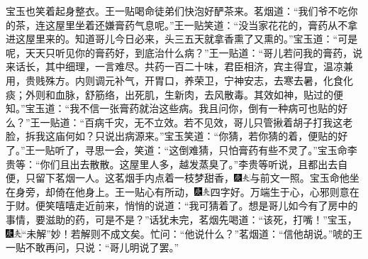 宝玉也笑着起身整衣。王一贴喝命徒弟们快泡好酽茶来。茗烟道：``我们爷不吃你的茶，连这屋里坐着还嫌膏药气息呢。''王一贴笑道：``没当家花花的，膏药从不拿进这屋里来的。知道哥儿今日必来，头三五天就拿香熏了又熏的。''宝玉道：``可是呢，天天只听见你的膏药好，到底治什么病？''王一贴道：``哥儿若问我的膏药，说来话长，其中细理，一言难尽。共药一百二十味，君臣相济，宾主得宜，温凉兼用，贵贱殊方。内则调元补气，开胃口，养荣卫，宁神安志，去寒去暑，化食化痰；外则和血脉，舒筋络，出死肌，生新肉，去风散毒。其效如神，贴过的便知。''宝玉道：``我不信一张膏药就治这些病。我且问你，倒有一种病可也贴的好么？''王一贴道：``百病千灾，无不立效。若不见效，哥儿只管揪着胡子打我这老脸，拆我这庙何如？只说出病源来。''宝玉笑道：``你猜，若你猜的着，便贴的好了。''王一贴听了，寻思一会，笑道：``这倒难猜，只怕膏药有些不灵了。''宝玉命李贵等：``你们且出去散散。这屋里人多，越发蒸臭了。''李贵等听说，且都出去自便，只留下茗烟一人。这茗烟手内点着一枝梦甜香，{\includegraphics[width=3mm]{../Images/00004}\includegraphics[width=3mm]{../Images/00012}\footnotesize \kaishu 与前文一照。}宝玉命他坐在身旁，却倚在他身上。王一贴心有所动，{\includegraphics[width=3mm]{../Images/00004}\includegraphics[width=3mm]{../Images/00012}\footnotesize \kaishu 四字好。万端生于心，心邪则意在于财。}便笑嘻嘻走近前来，悄悄的说道：``我可猜着了。想是哥儿如今有了房中的事情，要滋助的药，可是不是？''话犹未完，茗烟先喝道：``该死，打嘴！''宝玉，{\includegraphics[width=3mm]{../Images/00004}\includegraphics[width=3mm]{../Images/00012}\footnotesize \kaishu ``未解''妙！若解则不成文矣。}忙问：``他说什么？''茗烟道：``信他胡说。''唬的王一贴不敢再问，只说：``哥儿明说了罢。''

